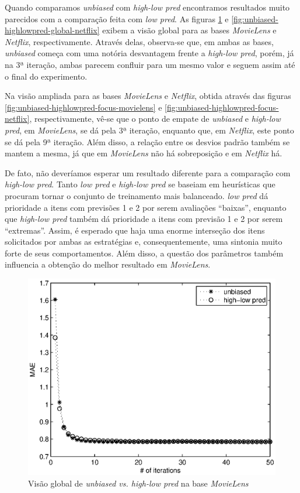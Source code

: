Quando comparamos \textit{unbiased} com \textit{high-low pred} encontramos resultados muito parecidos com a comparação feita com \textit{low pred}. As figuras \ref{fig:unbiased-highlowpred-global-movielens} e \ref{fig:unbiased-highlowpred-global-netflix} exibem a visão global para as bases \textit{MovieLens} e \textit{Netflix}, respectivamente. Através delas, observa-se que, em ambas as bases, \textit{unbiased} começa com uma notória desvantagem frente a \textit{high-low pred}, porém, já na 3ª iteração, ambas parecem confluir para um mesmo valor e seguem assim até o final do experimento.

Na visão ampliada para as bases \textit{MovieLens} e \textit{Netflix}, obtida através das figuras \ref{fig:unbiased-highlowpred-focus-movielens} e \ref{fig:unbiased-highlowpred-focus-netflix}, respectivamente, vê-se que o ponto de empate de \textit{unbiased} e \textit{high-low pred}, em \textit{MovieLens}, se dá pela 3ª iteração, enquanto que, em \textit{Netflix}, este ponto se dá pela 9ª iteração. Além disso, a relação entre os desvios padrão também se mantem a mesma, já que em \textit{MovieLens} não há sobreposição e em \textit{Netflix} há.

De fato, não deveríamos esperar um resultado diferente para a comparação com \textit{high-low pred}. Tanto \textit{low pred} e \textit{high-low pred} se baseiam em heurísticas que procuram tornar o conjunto de treinamento mais balanceado. \textit{low pred} dá prioridade a itens com previsões 1 e 2 por serem avaliações ``baixas'', enquanto que \textit{high-low pred} também dá prioridade a itens com previsão 1 e 2 por serem ``extremas''. Assim, é esperado que haja uma enorme interseção dos itens solicitados por ambas as estratégias e, consequentemente, uma sintonia muito forte de seus comportamentos. Além disso, a questão dos parâmetros também influencia a obtenção do melhor resultado em \textit{MovieLens}.

\begin{figure}[ht]
\centering
\includegraphics{ml_global_highlow_unbiased.eps}
\caption{Visão global de \textit{unbiased vs. high-low pred}  na base \textit{MovieLens}}
\label{fig:unbiased-highlowpred-global-movielens}
\end{figure}

